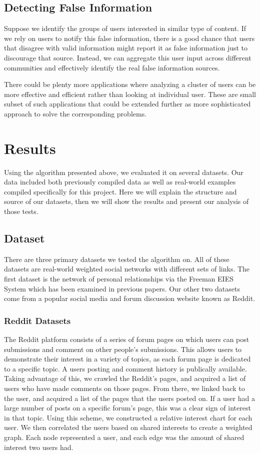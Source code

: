 \documentclass{article}
\begin{document}
\subsection{Detecting False Information}
Suppose we identify the groups of users interested in similar type of content. If we rely on users to notify this false
information, there is a good chance that users that disagree with valid information might report it as false information
just to discourage that source. Instead, we can aggregate this user input across different communities and effectively
identify the real false information sources. 

There could be plenty more applications where analyzing a cluster of users can be more effective and efficient rather
than looking at individual user. These are small subset of such applications that could be extended further as more
sophisticated approach to solve the corresponding problems.  
\section{Results}
Using the algorithm presented above, we evaluated it on several datasets. Our data included both previously compiled data as well as real-world examples compiled specifically for this project. Here we will explain the structure and source of our datasets, then we will show the results and present our analysis of those tests.

\subsection{Dataset}
There are three primary datasets we tested the algorithm on. All of these datasets are real-world weighted social networks with different sets of links. The first dataset is the network of personal relationships via the Freeman EIES System which has been examined in previous papers. Our other two datasets come from a popular social media and forum discussion website known as Reddit. 

\subsubsection{Reddit Datasets}
The Reddit platform consists of a series of forum pages on which users can post submissions and comment on other people's submissions. This allows users to demonstrate their interest in a variety of topics, as each forum page is dedicated to a specific topic. A users posting and comment history is publically available. Taking advantage of this, we crawled the Reddit's pages, and acquired a list of users who have made comments on those pages. From there, we linked back to the user, and acquired a list of the pages that the users posted on. If a user had a large number of posts on a specific forum's page, this was a clear sign of interest in that topic. Using this scheme, we constructed a relative interest chart for each user. We then correlated the users based on shared interests to create a weighted graph. Each node represented a user, and each edge was the amount of shared interest two users had. 
\end{document}
